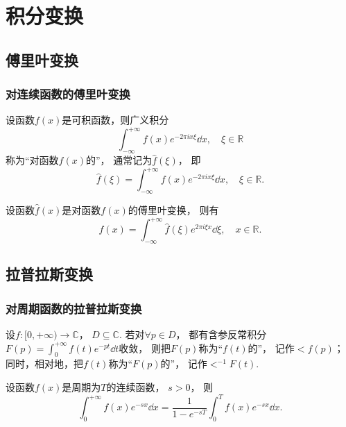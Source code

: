 \chapter{积分变换}
\section{傅里叶变换}
\subsection{对连续函数的傅里叶变换}
\begin{definition}
设函数\(f(x)\)是可积函数，则广义积分\[
	\int_{-\infty}^{+\infty}
	f(x) e^{-2 \pi i x \xi}
	\dd{x},
	\quad \xi \in \mathbb{R}
\]
称为“对函数\(f(x)\)的”，
通常记为\(\hat{f}(\xi)\)，
即\[
	\hat{f}(\xi)
	= \int_{-\infty}^{+\infty} f(x) e^{-2 \pi i x \xi} \dd{x},
	\quad \xi \in \mathbb{R}.
\]
\end{definition}

\begin{theorem}
设函数\(\hat{f}(x)\)是对函数\(f(x)\)的傅里叶变换，
则有\[
	f(x)
	= \int_{-\infty}^{+\infty}
	\hat{f}(\xi) e^{2 \pi i \xi x} \dd{\xi},
	\quad x \in \mathbb{R}.
\]
\end{theorem}

\section{拉普拉斯变换}
\subsection{对周期函数的拉普拉斯变换}
\begin{definition}
设\(f\colon[0,+\infty)\to\mathbb{C}\)，
\(D\subseteq\mathbb{C}\).
若对\(\forall p \in D\)，
都有含参反常积分\(F(p)=\int_0^{+\infty} f(t) e^{-pt} \dd{t}\)收敛，
则把\(F(p)\)称为“\(f(t)\)的”，
记作\(\lt f(p)\)；
同时，相对地，把\(f(t)\)称为“\(F(p)\)的”，
记作\(\lt^{-1} F(t)\).
\end{definition}

\begin{theorem}
设函数\(f(x)\)是周期为\(T\)的连续函数，
\(s>0\)，
则\[
	\int_0^{+\infty} f(x) e^{-sx} \dd{x}
	= \frac1{1-e^{-sT}}
	\int_0^T f(x) e^{-sx} \dd{x}.
\]
\end{theorem}
